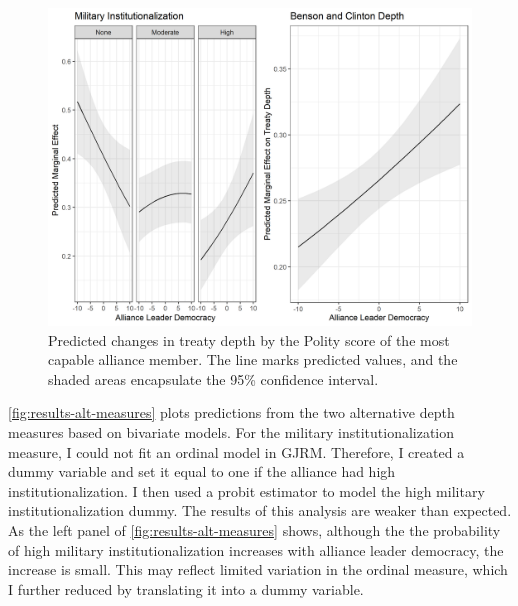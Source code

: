 \documentclass[12pt]{article}
\begin{document}
\begin{figure}
\includegraphics[width=.95\textwidth]{results-alt-measures-sep.png}  
\caption{Predicted changes in treaty depth by the Polity score of the most capable alliance member. The line marks predicted values, and the shaded areas encapsulate the 95\% confidence interval.}
\label{fig:results-alt-measures-sep}
\end{figure}


\autoref{fig:results-alt-measures} plots predictions from the two alternative depth measures based on bivariate models. 
For the military institutionalization measure, I could not fit an ordinal model in GJRM.
Therefore, I created a dummy variable and set it equal to one if the alliance had high institutionalization. 
I then used a probit estimator to model the high military institutionalization dummy. 
The results of this analysis are weaker than expected. 
As the left panel of \autoref{fig:results-alt-measures} shows, although the the probability of high military institutionalization increases with alliance leader democracy, the increase is small. 
This may reflect limited variation in the ordinal measure, which I further reduced by translating it into a dummy variable. 
\end{document}
